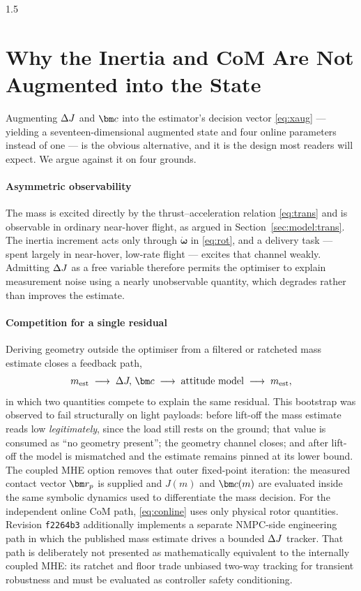 \begin{spacing}{1.5}
\section{Why the Inertia and CoM Are Not Augmented into the State}\label{sec:model:whynot}

Augmenting $\Delta J$ and $\cvec$ into the estimator's decision vector
\eqref{eq:xaug} --- yielding a seventeen-dimensional augmented state and
four online parameters instead of one --- is the obvious alternative, and
it is the design most readers will expect. We argue against it on four
grounds.

\paragraph{Asymmetric observability} The mass is excited directly by the
thrust--acceleration relation \eqref{eq:trans} and is observable in
ordinary near-hover flight, as argued in
Section~\ref{sec:model:trans}. The inertia increment acts only through
$\dot{\bm{\omega}}$ in \eqref{eq:rot}, and a delivery task --- spent
largely in near-hover, low-rate flight --- excites that channel weakly.
Admitting $\Delta J$ as a free variable therefore permits the optimiser to
explain measurement noise using a nearly unobservable quantity, which
degrades rather than improves the estimate.

\paragraph{Competition for a single residual} Deriving geometry outside
the optimiser from a filtered or ratcheted mass estimate closes a feedback path,
\begin{equation*}
m_{\mathrm{est}} \;\longrightarrow\; \dJ,\, \cvec
\;\longrightarrow\; \text{attitude model}
\;\longrightarrow\; m_{\mathrm{est}},
\end{equation*}
in which two quantities compete to explain the same residual. This
bootstrap was observed to fail structurally on light payloads: before
lift-off the mass estimate reads low \emph{legitimately}, since the load
still rests on the ground; that value is consumed as ``no geometry
present''; the geometry channel closes; and after lift-off the model is
mismatched and the estimate remains pinned at its lower bound. The
coupled MHE option removes that outer fixed-point iteration: the measured
contact vector $\rp$ is supplied and $J(m)$ and $\cvec(m)$ are evaluated
inside the same symbolic dynamics used to differentiate the mass
decision. For the independent online CoM path, \eqref{eq:conline} uses
only physical rotor quantities. Revision \texttt{f2264b3} additionally
implements a separate NMPC-side engineering path in which the published
mass estimate drives a bounded $\Delta J$ tracker. That path is deliberately
not presented as mathematically equivalent to the internally coupled
MHE: its ratchet and floor trade unbiased two-way tracking for transient
robustness and must be evaluated as controller safety conditioning.


\end{spacing}
